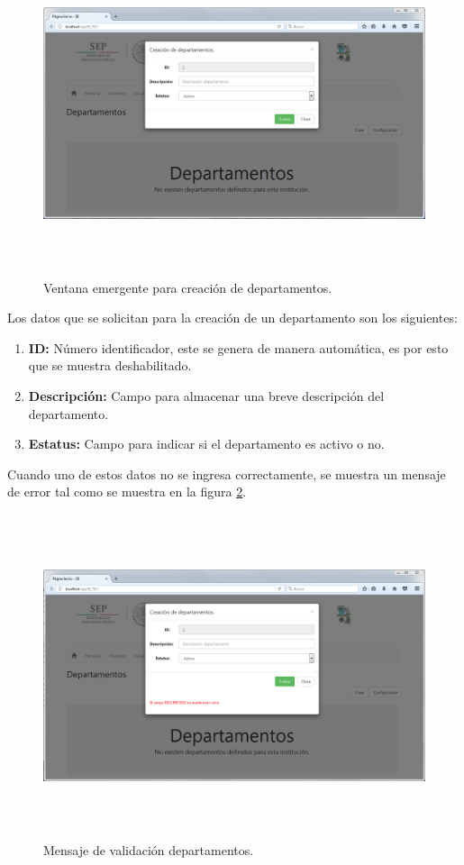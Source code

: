 			\begin{figure}[H]
		        \centering
		        \includegraphics[width=16cm, height=9.5cm]{figuras/DepartamentosCrear}
		        \caption{Ventana emergente para creaci\'on de departamentos.}
		        \label{fig_DepartamentosCrear}
		    \end{figure}
			
			Los datos que se solicitan para la creaci\'on de un departamento son los siguientes:
			\begin{enumerate}[1.]
				\item \textbf{ID:} N\'umero identificador, este se genera de manera autom\'atica, es por esto que se muestra deshabilitado.
				\item \textbf{Descripci\'on:} Campo para almacenar una breve descripci\'on del departamento.
				\item \textbf{Estatus:} Campo para indicar si el departamento es activo o no.
			\end{enumerate}

			Cuando uno de estos datos no se ingresa correctamente, se muestra un mensaje de error tal como se muestra en la figura \ref{fig_DepartamentosValida}.

			\begin{figure}[H]
		        \centering
		        \includegraphics[width=16cm, height=9.5cm]{figuras/DepartamentosValida}
		        \caption{Mensaje de validaci\'on departamentos.}
		        \label{fig_DepartamentosValida}
		    \end{figure}


